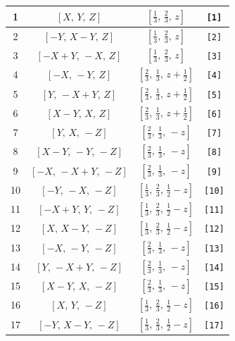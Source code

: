 \documentclass[fleqn,8pt]{jsarticle}
\begin{document}
\begin{longtable}{cccc}
1 & $\left[ X,\, Y,\, Z \right]$ & $\left[ \frac{1}{3},\, \frac{2}{3},\, z \right]$ & {\tt [1]} \\ \hline
2 & $\left[ - Y,\, X - Y,\, Z \right]$ & $\left[ \frac{1}{3},\, \frac{2}{3},\, z \right]$ & {\tt [2]} \\ \hline
3 & $\left[ - X + Y,\, - X,\, Z \right]$ & $\left[ \frac{1}{3},\, \frac{2}{3},\, z \right]$ & {\tt [3]} \\ \hline
4 & $\left[ - X,\, - Y,\, Z \right]$ & $\left[ \frac{2}{3},\, \frac{1}{3},\, z + \frac{1}{2} \right]$ & {\tt [4]} \\ \hline
5 & $\left[ Y,\, - X + Y,\, Z \right]$ & $\left[ \frac{2}{3},\, \frac{1}{3},\, z + \frac{1}{2} \right]$ & {\tt [5]} \\ \hline
6 & $\left[ X - Y,\, X,\, Z \right]$ & $\left[ \frac{2}{3},\, \frac{1}{3},\, z + \frac{1}{2} \right]$ & {\tt [6]} \\ \hline
7 & $\left[ Y,\, X,\, - Z \right]$ & $\left[ \frac{2}{3},\, \frac{1}{3},\, - z \right]$ & {\tt [7]} \\ \hline
8 & $\left[ X - Y,\, - Y,\, - Z \right]$ & $\left[ \frac{2}{3},\, \frac{1}{3},\, - z \right]$ & {\tt [8]} \\ \hline
9 & $\left[ - X,\, - X + Y,\, - Z \right]$ & $\left[ \frac{2}{3},\, \frac{1}{3},\, - z \right]$ & {\tt [9]} \\ \hline
10 & $\left[ - Y,\, - X,\, - Z \right]$ & $\left[ \frac{1}{3},\, \frac{2}{3},\, \frac{1}{2} - z \right]$ & {\tt [10]} \\ \hline
11 & $\left[ - X + Y,\, Y,\, - Z \right]$ & $\left[ \frac{1}{3},\, \frac{2}{3},\, \frac{1}{2} - z \right]$ & {\tt [11]} \\ \hline
12 & $\left[ X,\, X - Y,\, - Z \right]$ & $\left[ \frac{1}{3},\, \frac{2}{3},\, \frac{1}{2} - z \right]$ & {\tt [12]} \\ \hline
13 & $\left[ - X,\, - Y,\, - Z \right]$ & $\left[ \frac{2}{3},\, \frac{1}{3},\, - z \right]$ & {\tt [13]} \\ \hline
14 & $\left[ Y,\, - X + Y,\, - Z \right]$ & $\left[ \frac{2}{3},\, \frac{1}{3},\, - z \right]$ & {\tt [14]} \\ \hline
15 & $\left[ X - Y,\, X,\, - Z \right]$ & $\left[ \frac{2}{3},\, \frac{1}{3},\, - z \right]$ & {\tt [15]} \\ \hline
16 & $\left[ X,\, Y,\, - Z \right]$ & $\left[ \frac{1}{3},\, \frac{2}{3},\, \frac{1}{2} - z \right]$ & {\tt [16]} \\ \hline
17 & $\left[ - Y,\, X - Y,\, - Z \right]$ & $\left[ \frac{1}{3},\, \frac{2}{3},\, \frac{1}{2} - z \right]$ & {\tt [17]} \\ \hline

\end{longtable}
\end{document}
